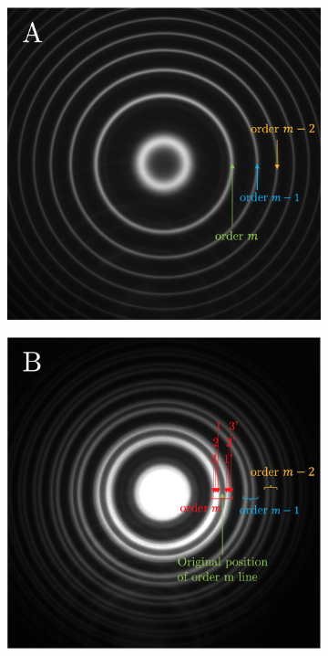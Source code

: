 \documentclass[11pt]{article}
\begin{document}
\begin{figure}[h!]
    \centering
    \begin{subfigure}{0.47\linewidth}
        \includegraphics[width=\linewidth]{Cd green/A2.png}
    \end{subfigure}
    \begin{subfigure}{0.47\linewidth}
        \includegraphics[width=\linewidth]{Cd green/B2.png}

\end{subfigure}
\end{figure}
\end{document}
